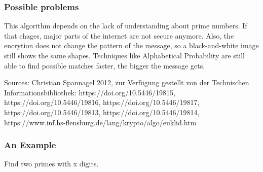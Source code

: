 \documentclass[11pt]{article}
\begin{document}
\hypertarget{possible-problems}{%
\subsubsection{Possible problems}\label{possible-problems}}

This algorithm depends on the lack of understanding about prime numbers.
If that chages, major parts of the internet are not secure anymore.
Also, the encrytion does not change the pattern of the message, so a
black-and-white image still shows the same shapes. Techniques like
Alphabetical Probability are still able to find possible matches faster,
the bigger the message gets.

Sources: Christian Spannagel 2012, zur Verfügung gestellt von der
Technischen Informationsbibliothek: https://doi.org/10.5446/19815,
https://doi.org/10.5446/19816, https://doi.org/10.5446/19817,
https://doi.org/10.5446/19813, https://doi.org/10.5446/19814,
https://www.inf.hs-flensburg.de/lang/krypto/algo/euklid.htm

\hypertarget{an-example}{%
\subsubsection{An Example}\label{an-example}}

Find two primes with x digits.
\end{document}
